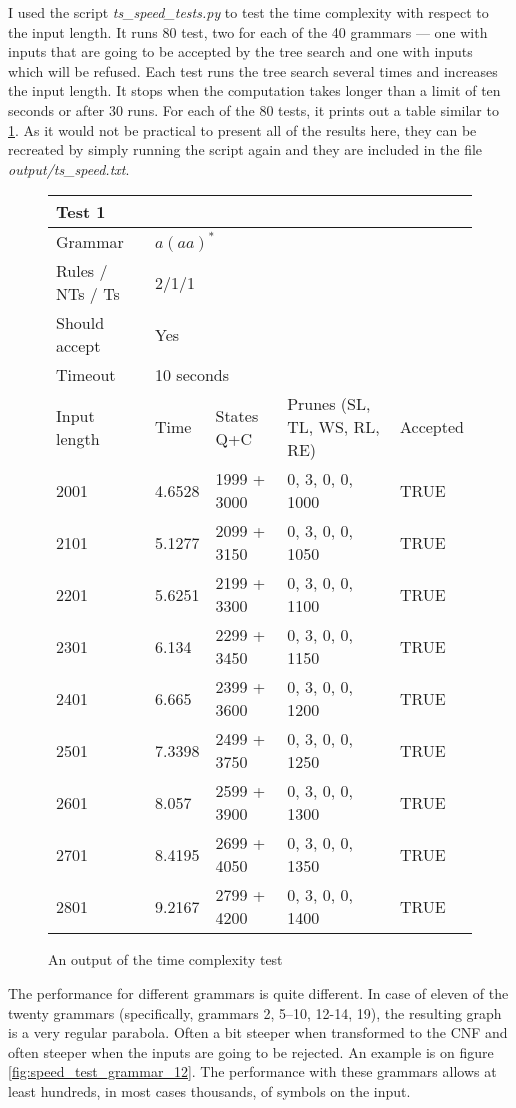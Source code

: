 I used the script \textit{ts\_speed\_tests.py} to test the time complexity with respect to the input length. It runs 80 test, two for each of the 40 grammars --- one with inputs that are going to be accepted by the tree search and one with inputs which will be refused. Each test runs the tree search several times and increases the input length. It stops when the computation takes longer than a limit of ten seconds or after 30 runs. For each of the 80 tests, it prints out a table similar to \ref{tab:input_compl_test}. As it would not be practical to present all of the results here, they can be recreated by simply running the script again and they are included in the file \textit{output/ts\_speed.txt}.

\begin{figure}[h!]
  \caption{An output of the time complexity test}
  \label{tab:input_compl_test}
\begin{tabular}{ |l|l|l|l|l|  }
  \hline
  \multicolumn{5}{|l|}{Test 1} \\
  \hline
  Grammar & \multicolumn{4}{|l|}{$a(aa)^*$} \\
  Rules / NTs / Ts & \multicolumn{4}{|l|}{2/1/1} \\
  Should accept & \multicolumn{4}{|l|}{Yes} \\
  Timeout & \multicolumn{4}{|l|}{10 seconds} \\
  \hline
  Input length & Time & States Q+C & Prunes (SL, TL, WS, RL, RE)& Accepted \\
  \hline
 2001 & 4.6528 & 1999 + 3000 & 0, 3, 0, 0, 1000 & TRUE \\
 2101 & 5.1277 & 2099 + 3150 & 0, 3, 0, 0, 1050 & TRUE \\
 2201 & 5.6251 &2199 + 3300 & 0, 3, 0, 0, 1100 & TRUE \\
 2301 & 6.134 & 2299 + 3450 & 0, 3, 0, 0, 1150 & TRUE \\
 2401 & 6.665 & 2399 + 3600 & 0, 3, 0, 0, 1200 & TRUE \\
 2501 & 7.3398 & 2499 + 3750 & 0, 3, 0, 0, 1250 & TRUE \\
 2601 & 8.057 & 2599 + 3900 & 0, 3, 0, 0, 1300 & TRUE \\
 2701 & 8.4195 & 2699 + 4050 & 0, 3, 0, 0, 1350 & TRUE \\
 2801 & 9.2167 & 2799 + 4200 & 0, 3, 0, 0, 1400 & TRUE \\
  \hline
  \hline
\end{tabular}
\end{figure}

The performance for different grammars is quite different. In case of eleven of the twenty grammars (specifically, grammars 2, 5--10, 12-14, 19), the resulting graph is a very regular parabola. Often a bit steeper when transformed to the CNF and often steeper when the inputs are going to be rejected. An example is on figure \ref{fig:speed_test_grammar_12}. The performance with these grammars allows at least hundreds, in most cases thousands, of symbols on the input.

